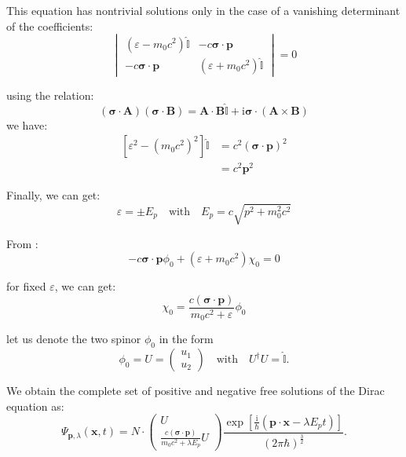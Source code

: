 This equation has nontrivial solutions only in the case of a vanishing determinant of the coefficients:
\begin{equation}
\begin{vmatrix}
(\varepsilon - m_0 c^2)\hat{\mathbb{I}} & -c \bm{\sigma} \cdot \bm{p} \\
-c \bm{\sigma} \cdot \bm{p} & (\varepsilon + m_0 c^2)\hat{\mathbb{I}}
\end{vmatrix} = 0
\end{equation}

using the relation:
\begin{equation}
(\bm{\sigma} \cdot \bm{A}) (\bm{\sigma} \cdot \bm{B}) = \bm{A} \cdot \bm{B} \hat{\mathbb{I}} + \mathrm{i} \bm{\sigma} \cdot (\bm{A} \times \bm{B})
\end{equation}
we have:
\begin{equation}
\begin{aligned}
[ \varepsilon^2 - (m_0 c^2)^2 ] \hat{\mathbb{I}} &= c^2 (\bm{\sigma} \cdot \bm{p})^2 \\
&= c^2 \bm{p}^2
\end{aligned}
\end{equation}

Finally, we can get:
\begin{equation}
\varepsilon = \pm E_p \quad \text{with} \quad E_p = c\sqrt{p^2 + m_0^2 c^2}
\end{equation}

From :
\begin{equation}
-c\bm{\sigma}\cdot\bm{p}\phi_0 + (\varepsilon + m_0 c^2)\chi_0 = 0
\end{equation}

for fixed $\varepsilon$, we can get:
\begin{equation}
\chi_0 = \frac{c(\bm{\sigma}\cdot\bm{p})}{m_0 c^2 + \varepsilon} \phi_0
\end{equation}

let us denote the two spinor $\phi_0$ in the form
\begin{equation}
\phi_0 = U = \begin{pmatrix} u_1 \\ u_2 \end{pmatrix} \quad \text{with} \quad U^\dagger U = \hat{\mathbb{I}}.
\end{equation}

We obtain the complete set of positive and negative free solutions of the Dirac equation as:
\begin{equation}
\Psi_{\bm{p},\lambda}(\bm{x},t) = N \cdot \begin{pmatrix} U \\ \frac{c(\bm{\sigma}\cdot\bm{p})}{m_0 c^2 + \lambda E_p} U \end{pmatrix} \frac{\exp\left[\frac{\mathrm{i}}{\hbar}(\bm{p}\cdot\bm{x} - \lambda E_p t)\right]}{(2\pi\hbar)^{\frac{3}{2}}}.
\end{equation}

